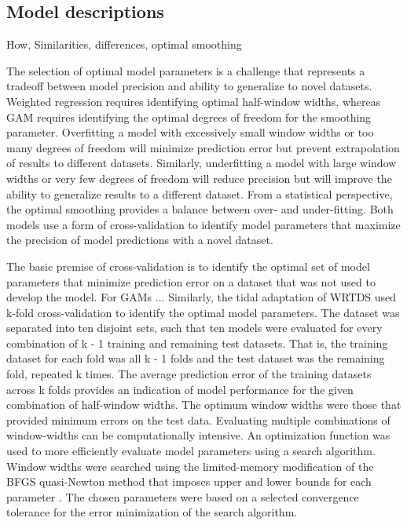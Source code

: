 \documentclass[letterpaper,12pt,oneside]{article}\usepackage[]{graphicx}\usepackage[]{color}
\begin{document}
\subsection{Model descriptions}

How, Similarities, differences, optimal smoothing

The selection of optimal model parameters is a challenge that represents a tradeoff between model precision and ability to generalize to novel datasets.  Weighted regression requires identifying optimal half-window widths, whereas \ac{GAM} requires identifying the optimal degrees of freedom for the smoothing parameter.  Overfitting a model with excessively small window widths or too many degrees of freedom will minimize prediction error but prevent extrapolation of results to different datasets. Similarly, underfitting a model with large window widths or very few degrees of freedom will reduce precision but will improve the ability to generalize results to a different dataset. From a statistical perspective, the optimal smoothing provides a balance between over- and under-fitting.  Both models use a form of cross-validation to identify model parameters that maximize the precision of model predictions with a novel dataset.   

The basic premise of cross-validation is to identify the optimal set of model parameters that minimize prediction error on a dataset that was not used to develop the model.  For \acp{GAM} \citep{Hastie90,Zuur12}... Similarly, the tidal adaptation of \ac{WRTDS} used k-fold cross-validation to identify the optimal model parameters.  The dataset was separated into ten disjoint sets, such that ten models were evaluated for every combination of k - 1 training and remaining test datasets. That is, the training dataset for each fold was all k - 1 folds and the test dataset was the remaining fold, repeated k times. The average prediction error of the training datasets across k folds provides an indication of model performance for the given combination of half-window widths.  The optimum window widths were those that provided minimum errors on the test data.  Evaluating multiple combinations of window-widths can be computationally intensive. An optimization function was used to more efficiently evaluate model parameters using a search algorithm.  Window widths were searched using the limited-memory modification of the BFGS quasi-Newton method that imposes upper and lower bounds for each parameter \citep{Byrd95}.  The chosen parameters were based on a selected convergence tolerance for the error minimization of the search algorithm.  
\end{document}

